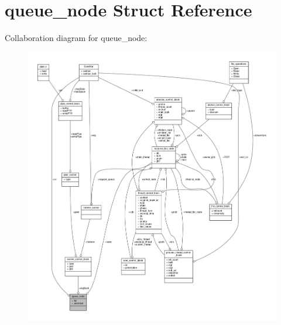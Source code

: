 \hypertarget{structqueue__node}{}\section{queue\+\_\+node Struct Reference}
\label{structqueue__node}


Collaboration diagram for queue\+\_\+node\+:
\nopagebreak
\begin{figure}[H]
\begin{center}
\leavevmode
\includegraphics[width=350pt]{structqueue__node__coll__graph}
\end{center}
\end{figure}
